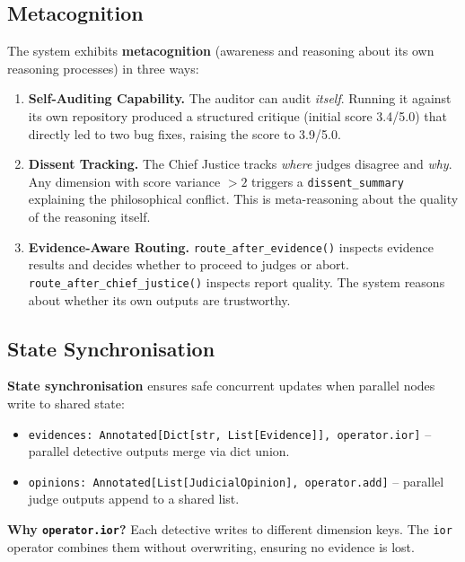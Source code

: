 \documentclass[11pt,a4paper]{article}
\begin{document}
\subsection{Metacognition}

The system exhibits \textbf{metacognition} (awareness and reasoning about
its own reasoning processes) in three ways:

\begin{enumerate}
    \item \textbf{Self-Auditing Capability.}
        The auditor can audit \emph{itself}.  Running it against its own
        repository produced a structured critique (initial score 3.4/5.0) that
        directly led to two bug fixes, raising the score to 3.9/5.0.

    \item \textbf{Dissent Tracking.}
        The Chief Justice tracks \emph{where} judges disagree and \emph{why}.
        Any dimension with score variance $> 2$ triggers a
        \texttt{dissent\_summary} explaining the philosophical conflict.
        This is meta-reasoning about the quality of the reasoning itself.

    \item \textbf{Evidence-Aware Routing.}
        \texttt{route\_after\_evidence()} inspects evidence results and decides
        whether to proceed to judges or abort.
        \texttt{route\_after\_chief\_justice()} inspects report quality.
        The system reasons about whether its own outputs are trustworthy.
\end{enumerate}

\subsection{State Synchronisation}

\textbf{State synchronisation} ensures safe concurrent updates when parallel
nodes write to shared state:

\begin{itemize}
    \item \texttt{evidences: Annotated[Dict[str, List[Evidence]], operator.ior]}
        -- parallel detective outputs merge via dict union.
    \item \texttt{opinions: Annotated[List[JudicialOpinion], operator.add]}
        -- parallel judge outputs append to a shared list.
\end{itemize}

\textbf{Why \texttt{operator.ior}?}  Each detective writes to different
dimension keys.  The \texttt{ior} operator combines them without overwriting,
ensuring no evidence is lost.
\end{document}
